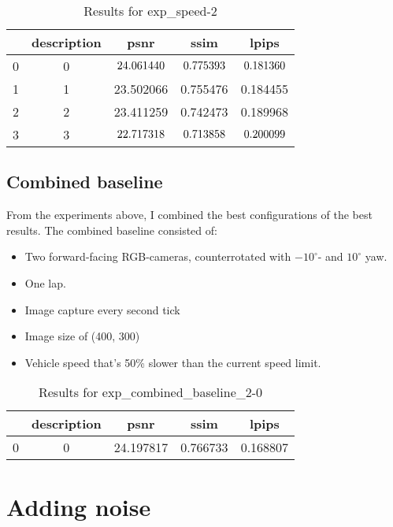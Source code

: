 \begin{table}[ht]
\centering
\caption{Results for exp\_speed-2}
\label{tab:exp_speed-2}
\begin{tabular}{|l|c|c|c|c|}
\hline
& description & psnr & ssim & lpips \\
\hline
0 & 0 & $\cellcolor{green} 24.061440$ & $\cellcolor{green} 0.775393$ & $\cellcolor{green} 0.181360$ \\
\cline{1-5}
1 & 1 & 23.502066 & 0.755476 & 0.184455 \\
\cline{1-5}
2 & 2 & 23.411259 & 0.742473 & 0.189968 \\
\cline{1-5}
3 & 3 & $\cellcolor{red} 22.717318$ & $\cellcolor{red} 0.713858$ & $\cellcolor{red} 0.200099$ \\
\cline{1-5}
\end{tabular}
\end{table}

\subsection{Combined baseline}
From the experiments above, I combined the best configurations of the best results. The combined baseline consisted of:

\begin{itemize}
    \item Two forward-facing RGB-cameras, counterrotated with $-10^\circ$- and $10^\circ$ yaw.
    \item One lap. %
    \item Image capture every second tick
    \item Image size of (400, 300)
    \item Vehicle speed that's 50\% slower than the current speed limit.
\end{itemize}

\begin{table}[ht]
\centering
\caption{Results for exp\_combined\_baseline\_2-0}
\label{tab:exp_combined_baseline_2-0}
\begin{tabular}{|l|c|c|c|c|}
\hline
 & description & psnr & ssim & lpips \\
\hline
0 & 0 & 24.197817 & 0.766733 & 0.168807 \\
\cline{1-5}
\end{tabular}
\end{table}


\section{Adding noise}
\begin{comment}
Information about GNSS-error
https://junipersys.com/support/article/6614#:~:text=Just%
\end{comment}

